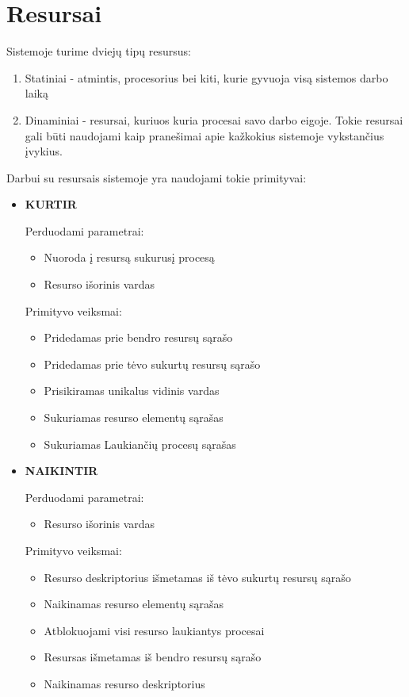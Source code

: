 \documentclass{scrartcl}
\begin{document}
    \section{Resursai}
      Sistemoje turime dviejų tipų resursus:
      \begin{enumerate}
        \item Statiniai - atmintis, procesorius bei kiti, kurie gyvuoja visą sistemos darbo laiką
        \item Dinaminiai - resursai, kuriuos kuria procesai savo darbo eigoje. Tokie resursai gali būti naudojami kaip pranešimai apie kažkokius sistemoje vykstančius įvykius.
      \end{enumerate}
      Darbui su resursais sistemoje yra naudojami tokie primityvai:
      \begin{itemize}
        \item \textbf{KURTIR}
          \par
          Perduodami parametrai:
          \begin{itemize}
            \item Nuoroda į resursą sukurusį procesą
            \item Resurso išorinis vardas
          \end{itemize}
          Primityvo veiksmai:
          \begin{itemize}
            \item Pridedamas prie bendro resursų sąrašo
            \item Pridedamas prie tėvo sukurtų resursų sąrašo
            \item Prisikiramas unikalus vidinis vardas
            \item Sukuriamas resurso elementų sąrašas
            \item Sukuriamas Laukiančių procesų sąrašas
          \end{itemize}

        \item \textbf{NAIKINTIR}
          \par
          Perduodami parametrai:
          \begin{itemize}
            \item Resurso išorinis vardas
          \end{itemize}
          Primityvo veiksmai:
          \begin{itemize}
            \item Resurso deskriptorius išmetamas iš tėvo sukurtų resursų sąrašo
            \item Naikinamas resurso elementų sąrašas
            \item Atblokuojami visi resurso laukiantys procesai
            \item Resursas išmetamas iš bendro resursų sąrašo
            \item Naikinamas resurso deskriptorius
          \end{itemize}


\end{itemize}
\end{document}
